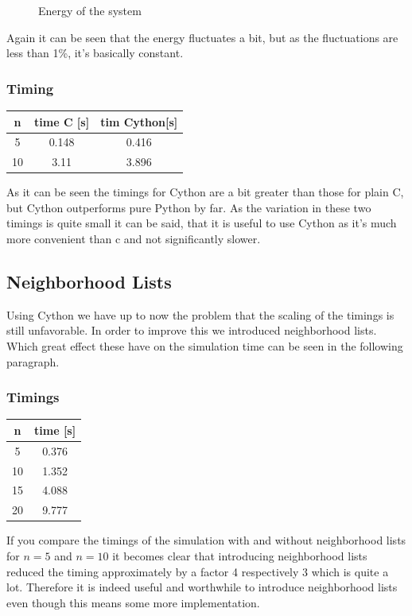 \documentclass[12pt,a4paper]{scrartcl}
\begin{document}
\begin{figure}[H]
	\resizebox{1\textwidth}{!}{}
	
	\caption{Energy of the system}\label{fig:Energy of the system}
\end{figure}
Again it can be seen that the energy fluctuates a bit, but as the fluctuations are less than 1\%, it's basically constant.

\subsubsection{Timing}

\begin{center}
\begin{tabular}{c c c}\toprule
n&time C [s]&tim Cython[s]\\ \midrule
5&0.148&0.416\\
10&3.11&3.896\\ \bottomrule
\end{tabular}
\end{center}
As it can be seen the timings for Cython are a bit greater than those for plain C, but Cython outperforms pure Python by far. As the variation in these two timings is quite small it can be said, that it is useful to use Cython as it's much more convenient than c and not significantly slower.
\subsection{Neighborhood Lists}
Using Cython we have up to now the problem that the scaling of the timings is still unfavorable. In order to improve this we introduced neighborhood lists. Which great effect these have on the simulation time can be seen in the following paragraph. 
\subsubsection{Timings}
\begin{center}
\begin{tabular}{c c}\toprule
n&time [s]\\ \midrule
5&0.376\\
10&1.352\\
15&4.088\\ 
20&9.777\\
 \bottomrule
\end{tabular}
\end{center}
If you compare the timings of the simulation with and without neighborhood lists for $n=5$ and $n=10$ it becomes clear that introducing neighborhood lists reduced the timing approximately by a factor 4 respectively 3  which is quite a lot. Therefore it is indeed useful and worthwhile to introduce neighborhood lists even though this means some more implementation. 
\end{document}
